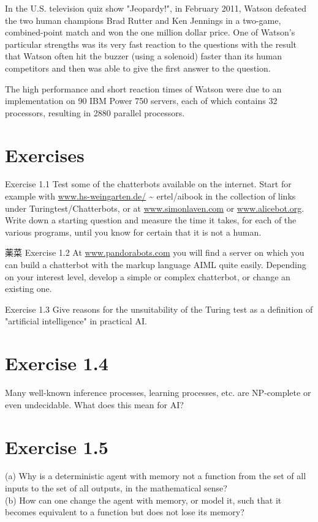 \documentclass[10pt]{book}
\begin{document}
In the U.S. television quiz show "Jeopardy!", in February 2011, Watson defeated the two human champions Brad Rutter and Ken Jennings in a two-game, combined-point match and won the one million dollar price. One of Watson's particular strengths was its very fast reaction to the questions with the result that Watson often hit the buzzer (using a solenoid) faster than its human competitors and then was able to give the first answer to the question.

The high performance and short reaction times of Watson were due to an implementation on 90 IBM Power 750 servers, each of which contains 32 processors, resulting in 2880 parallel processors.

\section{Exercises}
Exercise 1.1 Test some of the chatterbots available on the internet. Start for example with \href{http://www.hs-weingarten.de/}{www.hs-weingarten.de/} \~{} ertel/aibook in the collection of links under Turingtest/Chatterbots, or at \href{http://www.simonlaven.com}{www.simonlaven.com} or \href{http://www.alicebot.org}{www.alicebot.org}. Write down a starting question and measure the time it takes, for each of the various programs, until you know for certain that it is not a human.

薬菜 Exercise 1.2 At \href{http://www.pandorabots.com}{www.pandorabots.com} you will find a server on which you can build a chatterbot with the markup language AIML quite easily. Depending on your interest level, develop a simple or complex chatterbot, or change an existing one.

Exercise 1.3 Give reasons for the unsuitability of the Turing test as a definition of "artificial intelligence" in practical AI.\\
\section{Exercise 1.4}
Many well-known inference processes, learning processes, etc. are NP-complete or even undecidable. What does this mean for AI?

\section{Exercise 1.5}
(a) Why is a deterministic agent with memory not a function from the set of all inputs to the set of all outputs, in the mathematical sense?\\
(b) How can one change the agent with memory, or model it, such that it becomes equivalent to a function but does not lose its memory?\\
\end{document}
